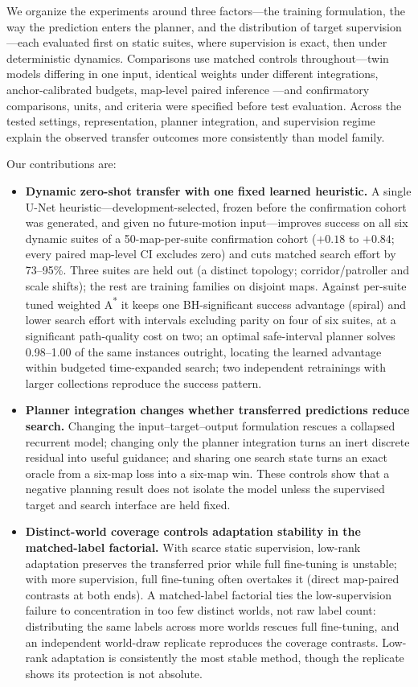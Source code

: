 \documentclass[letterpaper]{article} %
\begin{document}
We organize the experiments around three factors---the training formulation, the way the prediction enters the planner, and the distribution of target supervision---each evaluated first on static suites, where supervision is exact, then under deterministic dynamics. Comparisons use matched controls throughout---twin models differing in one input, identical weights under different integrations, anchor-calibrated budgets, map-level paired inference \citep{henderson2018matters,agarwal2021precipice,pineau2021reproducibility}---and confirmatory comparisons, units, and criteria were specified before test evaluation. Across the tested settings, representation, planner integration, and supervision regime explain the observed transfer outcomes more consistently than model family.

Our contributions are:
\begin{itemize}
    \item \textbf{Dynamic zero-shot transfer with one fixed learned heuristic.} A single U-Net heuristic---development-selected, frozen before the confirmation cohort was generated, and given no future-motion input---improves success on all six dynamic suites of a 50-map-per-suite confirmation cohort ($+0.18$ to $+0.84$; every paired map-level CI excludes zero) and cuts matched search effort by 73--95\%. Three suites are held out (a distinct topology; corridor/patroller and scale shifts); the rest are training families on disjoint maps. Against per-suite tuned weighted A\textsuperscript{*} it keeps one BH-significant success advantage (spiral) and lower search effort with intervals excluding parity on four of six suites, at a significant path-quality cost on two; an optimal safe-interval planner solves 0.98--1.00 of the same instances outright, locating the learned advantage within budgeted time-expanded search; two independent retrainings with larger collections reproduce the success pattern.
    \item \textbf{Planner integration changes whether transferred predictions reduce search.} Changing the input--target--output formulation rescues a collapsed recurrent model; changing only the planner integration turns an inert discrete residual into useful guidance; and sharing one search state turns an exact oracle from a six-map loss into a six-map win. These controls show that a negative planning result does not isolate the model unless the supervised target and search interface are held fixed.
    \item \textbf{Distinct-world coverage controls adaptation stability in the matched-label factorial.} With scarce static supervision, low-rank adaptation preserves the transferred prior while full fine-tuning is unstable; with more supervision, full fine-tuning often overtakes it (direct map-paired contrasts at both ends). A matched-label factorial ties the low-supervision failure to concentration in too few distinct worlds, not raw label count: distributing the same labels across more worlds rescues full fine-tuning, and an independent world-draw replicate reproduces the coverage contrasts. Low-rank adaptation is consistently the most stable method, though the replicate shows its protection is not absolute.
\end{itemize}
\end{document}
